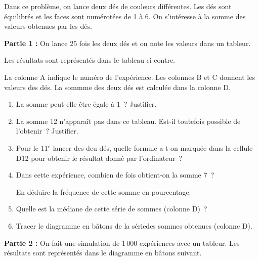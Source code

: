 \documentclass[exercice]{thedocument}%
\begin{document}
%
\begin{minipage}[t]{.5\linewidth}
    Dans ce problème, on lance deux dés de couleurs différentes. Les dés sont
    équilibrés et les faces sont numérotées de 1 à 6. On s'intéresse à la somme
    des valeurs obtenues par les dés.\par\noindent
    {\bfseries Partie 1 : }On lance 25 fois les deux dés et on note les valeurs dans un
    tableur.\par\noindent Les résultats sont représentés dans le tableau ci-contre.
    \par\noindent La colonne A indique le numéro de l'expérience. Les colonnes B
    et C donnent les valeurs des dés. La sommme des deux dés est calculée dans la
    colonne D.
    \begin{enumerate}
        \item La somme peut-elle être égale à 1~? Justifier.
        \item La somme 12 n'apparaît pas dans ce tableau. Est-il toutefois possible
        de l'obtenir~? Justifier.
        \item Pour le 11$^e$ lancer des deu dés, quelle formule a-t-on marquée
        dans la cellule D12 pour obtenir le résultat donné par l'ordinateur~?
        \item Dans cette expérience, combien de fois obtient-on la somme 7~?
        \par\noindent En déduire la fréquence de cette somme en pourcentage.
        \item Quelle est la médiane de cette série de sommes (colonne D)~?
        \item Tracer le diagramme en bâtons de la sériedes sommes obtenues
        (colonne D).
    \end{enumerate}
\end{minipage}\hspace{0.1\linewidth}
\begin{minipage}[t]{.39\linewidth}
    \centering{}\par
\end{minipage}\bigskip\par\noindent
{\bfseries Partie 2 : }On fait une simulation de $1\,000$ expériences avec un tableur.
Les résultats sont représentés dans le diagramme en bâtons suivant.
\centering{}\par
\end{document}
